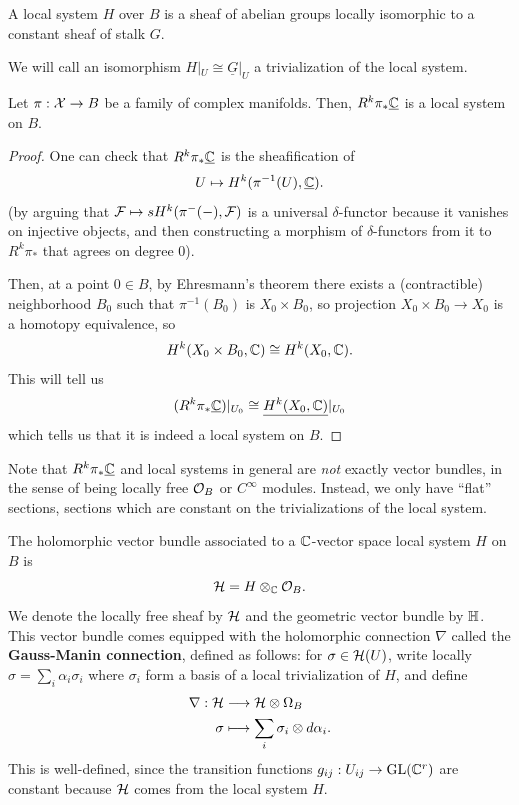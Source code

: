 \documentclass[12pt]{article}
\begin{document}
\begin{defn}
    A local system $H$ over $B$ is a sheaf of abelian groups locally isomorphic to a constant sheaf of stalk $G$.
\end{defn}

We will call an isomorphism $H|_U \cong \underline{G}|_U$ a trivialization of the local system.

\begin{prop}
    Let $\pi: \mathcal{X} \to B$ be a family of complex manifolds. Then, $R^k\pi_* \underline{\mathbb{C}}$ is a local system on $B$.
\end{prop}

\begin{proof}
    One can check that $R^k\pi_* \underline{\mathbb{C}}$ is the sheafification of
    \[U\mapsto H^k(\pi^{-1}(U), \underline{\mathbb{C}}).\]
    (by arguing that $\mathcal{F} \mapsto s H^k(\pi^{-}(-),\mathcal{F})$ is a universal $\delta$-functor because it vanishes on injective objects, and then constructing a morphism of $\delta$-functors from it to $R^k\pi_*$ that agrees on degree 0).

    Then, at a point $0\in B$, by Ehresmann's theorem there exists a (contractible) neighborhood $B_0$ such that $\pi^{-1}(B_0)$ is $X_0\times B_0$, so projection $X_0\times B_0\to X_0$ is a homotopy equivalence, so
    \[H^k(X_0\times B_0, \mathbb{C}) \cong H^k(X_0,\mathbb{C}).\]
    This will tell us
    \[(R^k\pi_* \underline{\mathbb{C}})|_{U_0} \cong \underline{H^k(X_0,\mathbb{C})}|_{U_0}\]
    which tells us that it is indeed a local system on $B$.
\end{proof}

Note that $R^k\pi_* \underline{\mathbb{C}}$ and local systems in general are \textit{not} exactly vector bundles, in the sense of being locally free $\mathcal{O}_B$ or $C^\infty$ modules. Instead, we only have ``flat'' sections, sections which are constant on the trivializations of the local system.

\begin{defn}
    The holomorphic vector bundle associated to a $\mathbb{C}$-vector space local system $H$ on $B$ is
    \[\mathcal{H} = H \otimes_{\mathbb{C}} \mathcal{O}_B.\]
    We denote the locally free sheaf by $\mathcal{H}$ and the geometric vector bundle by $\mathbb{H}$. This vector bundle comes equipped with the holomorphic connection $\nabla$ called the \textbf{Gauss-Manin connection}, defined as follows: for $\sigma\in \mathcal{H}(U)$, write locally $\sigma = \sum_i \alpha_i \sigma_i$ where $\sigma_i$ form a basis of a local trivialization of $H$, and define
    \begin{align*}
        \nabla: \mathcal{H} &\longrightarrow \mathcal{H} \otimes \Omega_B\\
        \sigma &\longmapsto \sum_{i} \sigma_i \otimes d \alpha_i.
    \end{align*}
    This is well-defined, since the transition functions $g_{ij}: U_{ij}\to \mathrm{GL}(\mathbb{C}^r)$ are constant because $\mathcal{H}$ comes from the local system $H$.
\end{defn}
\end{document}
